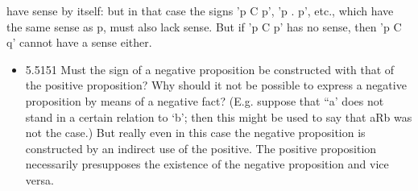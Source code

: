 \documentclass[11pt]{article}
\begin{document}
\begin{itemize}
have sense by itself: but in that case the signs 'p C p', 'p . p', etc.,
which have the same sense as p, must also lack sense. But if 'p C p' has no
sense, then 'p C q' cannot have a sense either.
\begin{itemize}
\item 5.5151
\label{sec:org7bd3253}
Must the sign of a negative proposition be constructed with that of
the positive proposition? Why should it not be possible to express a
negative proposition by means of a negative fact? (E.g. suppose that ``a'
does not stand in a certain relation to `b'; then this might be used to say
that aRb was not the case.) But really even in this case the negative
proposition is constructed by an indirect use of the positive. The positive
proposition necessarily presupposes the existence of the negative
proposition and vice versa.
\end{itemize}
\end{itemize}
\end{document}
